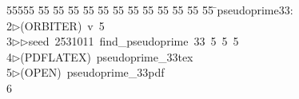 %
%
\begin{tabbing}
55555 \= 55 \= 55 \= 55 \= 55 \= 55 \= 55 \= 55 \= 55 \= 55 \= 55 \= 55 \= 55 \= \>pseudoprime33:\\[0pt]
2\>$\triangleright$\>(ORBITER)\ v\ 5\ \\[0pt]
3\>$\triangleright$\>$\triangleright$\>seed\ 2531011\ find\_pseudoprime\ 33\ 5\ 5\ 5\ \\[0pt]
4\>$\triangleright$\>(PDFLATEX)\ pseudoprime\_33tex\\[0pt]
5\>$\triangleright$\>(OPEN)\ pseudoprime\_33pdf\\[0pt]
6\>\end{tabbing}
